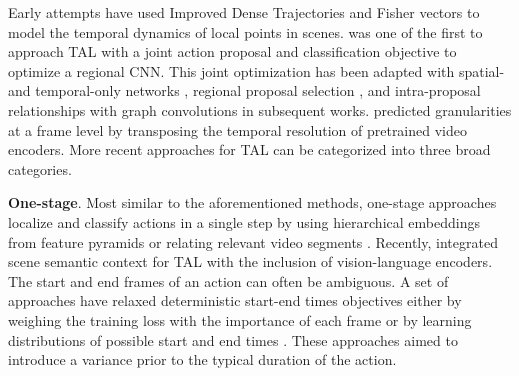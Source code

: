 Early attempts have used Improved Dense Trajectories \citep{wang2013action} and Fisher vectors \citep{oneata2013action} to model the temporal dynamics of local points in scenes. \citet{shou2016temporal} was one of the first to approach TAL with a joint action proposal and classification objective to optimize a regional CNN. This joint optimization has been adapted with spatial- and temporal-only networks \citep{lin2018bsn,paul2018w,wang2017untrimmednets}, regional proposal selection \citep{chao2018rethinking,xu2017r}, and intra-proposal relationships with graph convolutions \citep{zeng2019graph} in subsequent works. \citet{shou2017cdc} predicted granularities at a frame level by transposing the temporal resolution of pretrained video encoders. More recent approaches for TAL can be categorized into three broad categories. 

\noindent
\textbf{One-stage}. Most similar to the aforementioned methods, one-stage approaches localize and classify actions in a single step by using hierarchical embeddings from feature pyramids \citep{lin2021learning,liu2020progressive,shi2023tridet,zhang2022actionformer} or relating relevant video segments \citep{shou2018autoloc,yang2020localizing}. Recently, \citet{yan2023unloc} integrated scene semantic context for TAL with the inclusion of vision-language encoders. The start and end frames of an action can often be ambiguous. A set of approaches have relaxed deterministic start-end times objectives either by weighing the training loss with the importance of each frame \citep{shao2023action} or by
learning distributions of possible start and end times \citep{moltisanti2019action}. These approaches aimed to introduce a variance prior to the typical duration of the action. 

